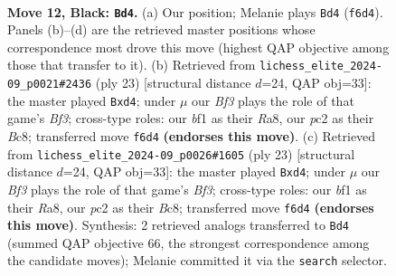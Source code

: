 \documentclass[11pt]{article}
\begin{document}
\clearpage

\begin{figure}[p]\centering
\begin{subfigure}{0.46\textwidth}\centering
\resizebox{\linewidth}{!}{%
\newchessgame
\chessboard[
  setfen={r1bq2k1/pppp1ppp/3n1b2/3P4/8/8/PPP2PPP/RNB1QBK1 b - - 0 12},
  showmover=false,
  pgfstyle=straightmove, color=movearrow, markmove={f6-d4}
]}
\caption{}
\end{subfigure}\hfill
\begin{subfigure}{0.46\textwidth}\centering
\resizebox{\linewidth}{!}{%
\newchessgame
\chessboard[
  setfen={r1bq2k1/pppp1ppp/3n1b2/8/3P4/2N5/PPP2PPP/R1B1QBK1 b - - 0 12},
  showmover=false,
  pgfstyle=straightmove, color=movearrow, markmove={f6-d4}
]}
\caption{}
\end{subfigure}
\\[4pt]
\begin{subfigure}{0.46\textwidth}\centering
\resizebox{\linewidth}{!}{%
\newchessgame
\chessboard[
  setfen={r1bq2k1/pppp1ppp/3n1b2/8/3P4/2N5/PPP2PPP/R1B1QBK1 b - - 0 12},
  showmover=false,
  pgfstyle=straightmove, color=movearrow, markmove={f6-d4}
]}
\caption{}
\end{subfigure}\hfill

\caption{\textbf{Move 12, Black: \texttt{Bd4}.} (a) Our position; Melanie plays \texttt{Bd4} (\texttt{f6d4}). Panels (b)--(d) are the retrieved master positions whose correspondence most drove this move (highest QAP objective among those that transfer to it). (b) Retrieved from \texttt{lichess\_elite\_2024-09\_p0021\#2436} (ply 23) [structural distance $d$=24, QAP obj=33]: the master played \texttt{Bxd4}; under $\mu$ our \emph{Bf3} plays the role of that game's \emph{Bf3}; cross-type roles: our \emph{b}f1 as their \emph{R}a8, our \emph{p}c2 as their \emph{B}c8; transferred move \texttt{f6d4} \textbf{(endorses this move)}. (c) Retrieved from \texttt{lichess\_elite\_2024-09\_p0026\#1605} (ply 23) [structural distance $d$=24, QAP obj=33]: the master played \texttt{Bxd4}; under $\mu$ our \emph{Bf3} plays the role of that game's \emph{Bf3}; cross-type roles: our \emph{b}f1 as their \emph{R}a8, our \emph{p}c2 as their \emph{B}c8; transferred move \texttt{f6d4} \textbf{(endorses this move)}. Synthesis: 2 retrieved analogs transferred to \texttt{Bd4} (summed QAP objective 66, the strongest correspondence among the candidate moves); Melanie committed it via the \texttt{search} selector.}
\label{fig:thought-m23}
\end{figure}
\end{document}
